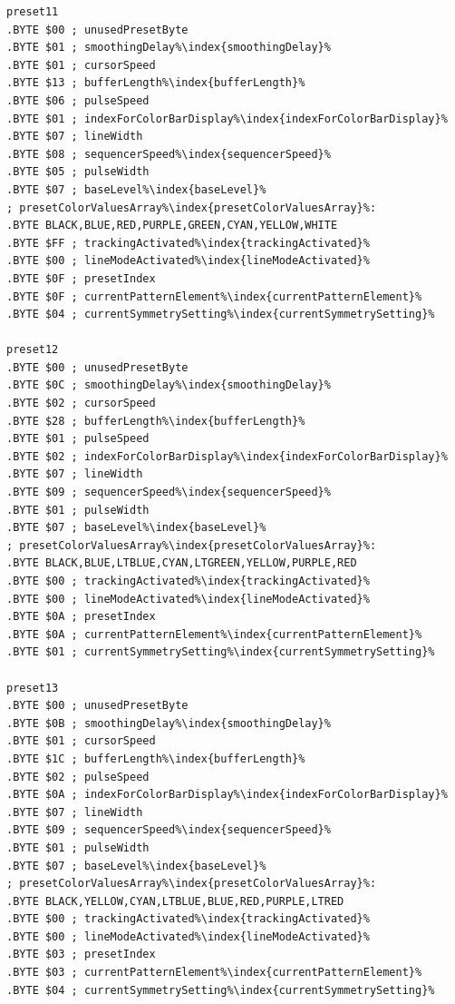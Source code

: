 \begin{minipage}[b]{0.33\linewidth}
\begin{lrbox}{\mybox}%
\begin{lstlisting}[basicstyle=\ttfamily\tiny,escapechar=\%]
preset11
.BYTE $00 ; unusedPresetByte
.BYTE $01 ; smoothingDelay%\index{smoothingDelay}%
.BYTE $01 ; cursorSpeed
.BYTE $13 ; bufferLength%\index{bufferLength}%
.BYTE $06 ; pulseSpeed
.BYTE $01 ; indexForColorBarDisplay%\index{indexForColorBarDisplay}%
.BYTE $07 ; lineWidth
.BYTE $08 ; sequencerSpeed%\index{sequencerSpeed}%
.BYTE $05 ; pulseWidth
.BYTE $07 ; baseLevel%\index{baseLevel}%
; presetColorValuesArray%\index{presetColorValuesArray}%: 
.BYTE BLACK,BLUE,RED,PURPLE,GREEN,CYAN,YELLOW,WHITE
.BYTE $FF ; trackingActivated%\index{trackingActivated}%
.BYTE $00 ; lineModeActivated%\index{lineModeActivated}%
.BYTE $0F ; presetIndex
.BYTE $0F ; currentPatternElement%\index{currentPatternElement}%
.BYTE $04 ; currentSymmetrySetting%\index{currentSymmetrySetting}%

preset12
.BYTE $00 ; unusedPresetByte
.BYTE $0C ; smoothingDelay%\index{smoothingDelay}%
.BYTE $02 ; cursorSpeed
.BYTE $28 ; bufferLength%\index{bufferLength}%
.BYTE $01 ; pulseSpeed
.BYTE $02 ; indexForColorBarDisplay%\index{indexForColorBarDisplay}%
.BYTE $07 ; lineWidth
.BYTE $09 ; sequencerSpeed%\index{sequencerSpeed}%
.BYTE $01 ; pulseWidth
.BYTE $07 ; baseLevel%\index{baseLevel}%
; presetColorValuesArray%\index{presetColorValuesArray}%: 
.BYTE BLACK,BLUE,LTBLUE,CYAN,LTGREEN,YELLOW,PURPLE,RED
.BYTE $00 ; trackingActivated%\index{trackingActivated}%
.BYTE $00 ; lineModeActivated%\index{lineModeActivated}%
.BYTE $0A ; presetIndex
.BYTE $0A ; currentPatternElement%\index{currentPatternElement}%
.BYTE $01 ; currentSymmetrySetting%\index{currentSymmetrySetting}%

preset13
.BYTE $00 ; unusedPresetByte
.BYTE $0B ; smoothingDelay%\index{smoothingDelay}%
.BYTE $01 ; cursorSpeed
.BYTE $1C ; bufferLength%\index{bufferLength}%
.BYTE $02 ; pulseSpeed
.BYTE $0A ; indexForColorBarDisplay%\index{indexForColorBarDisplay}%
.BYTE $07 ; lineWidth
.BYTE $09 ; sequencerSpeed%\index{sequencerSpeed}%
.BYTE $01 ; pulseWidth
.BYTE $07 ; baseLevel%\index{baseLevel}%
; presetColorValuesArray%\index{presetColorValuesArray}%: 
.BYTE BLACK,YELLOW,CYAN,LTBLUE,BLUE,RED,PURPLE,LTRED
.BYTE $00 ; trackingActivated%\index{trackingActivated}%
.BYTE $00 ; lineModeActivated%\index{lineModeActivated}%
.BYTE $03 ; presetIndex
.BYTE $03 ; currentPatternElement%\index{currentPatternElement}%
.BYTE $04 ; currentSymmetrySetting%\index{currentSymmetrySetting}%


\end{lstlisting}
\end{lrbox}
\end{minipage}
